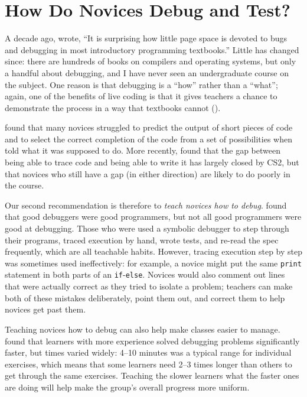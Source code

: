 \section{How Do Novices Debug and Test?}\label{s:pck-debug}

A decade ago, \cite{McCa2008} wrote, ``It is surprising how little
page space is devoted to bugs and debugging in most introductory
programming textbooks.''  Little has changed since: there are hundreds
of books on compilers and operating systems, but only a handful about
debugging, and I have never seen an undergraduate course on the
subject.  One reason is that debugging is a ``how'' rather than a
``what''; again, one of the benefits of live coding is that it gives
teachers a chance to demonstrate the process in a way that textbooks
cannot ().

\cite{List2004,List2009} found that many novices struggled to predict
the output of short pieces of code and to select the correct
completion of the code from a set of possibilities when told what it
was supposed to do.  More recently, \cite{Harr2018} found that the gap
between being able to trace code and being able to write it has
largely closed by CS2, but that novices who still have a gap (in
either direction) are likely to do poorly in the course.

Our second recommendation is therefore to \emph{teach novices how to
  debug}.  \cite{Fitz2008,Murp2008} found that good debuggers were
good programmers, but not all good programmers were good at debugging.
Those who were used a symbolic debugger to step through their
programs, traced execution by hand, wrote tests, and re-read the spec
frequently, which are all teachable habits. However, tracing execution
step by step was sometimes used ineffectively: for example, a novice
might put the same \texttt{print} statement in both parts of an
\texttt{if}-\texttt{else}.  Novices would also comment out lines that
were actually correct as they tried to isolate a problem; teachers can
make both of these mistakes deliberately, point them out, and correct
them to help novices get past them.

Teaching novices how to debug can also help make classes easier to
manage.  \cite{Alqa2017} found that learners with more experience
solved debugging problems significantly faster, but times varied
widely: 4--10 minutes was a typical range for individual exercises,
which means that some learners need 2--3 times longer than others to
get through the same exercises.  Teaching the slower learners what the
faster ones are doing will help make the group's overall progress more
uniform.

